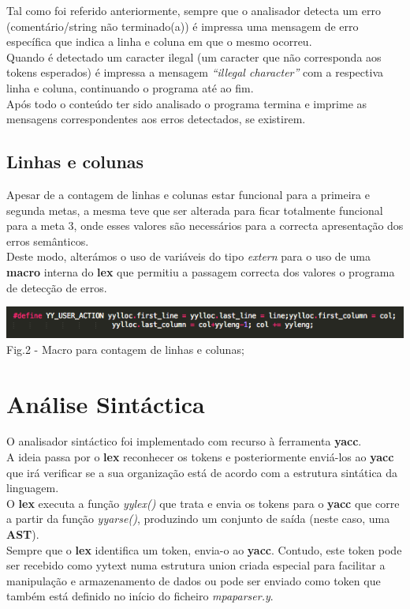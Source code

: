 \documentclass[12pt]{article}
\begin{document}
\indent Tal como foi referido anteriormente, sempre que o analisador detecta um erro (comentário/string não terminado(a)) é impressa uma mensagem de erro específica que indica a linha e coluna em que o mesmo ocorreu.\\
\indent Quando é detectado um caracter ilegal (um caracter que não corresponda aos tokens esperados) é impressa a mensagem \textit{``illegal character''} com a respectiva linha e coluna, continuando o programa até ao fim.\\
\indent Após todo o conteúdo ter sido analisado o programa termina e imprime as mensagens correspondentes aos erros detectados, se existirem.

\newpage

\subsection{Linhas e colunas}

\indent Apesar de a contagem de linhas e colunas estar funcional para a primeira e segunda metas, a mesma teve que ser alterada para ficar totalmente funcional para a meta 3, onde esses valores são necessários para a correcta apresentação dos erros semânticos.\\
\indent Deste modo, alterámos o uso de variáveis do tipo \textit{extern} para o uso de uma \textbf{macro} interna do \textbf{lex} que permitiu a passagem correcta dos valores o programa de detecção de erros.

\begin{center}
\includegraphics[scale=0.9]{column_line_macro.png}\\
Fig.2 - Macro para contagem de linhas e colunas;
\end{center}


\newpage

\section{Análise Sintáctica}

\indent O analisador sintáctico foi implementado com recurso à ferramenta \textbf{yacc}.\\
\indent A ideia passa por o \textbf{lex} reconhecer os tokens e posteriormente enviá-los ao \textbf{yacc} que irá verificar se a sua organização está de acordo com a estrutura sintática da linguagem.\\
\indent O \textbf{lex} executa a função \textit{yylex()} que trata e envia os tokens para o \textbf{yacc} que corre a partir da função \textit{yyarse()}, produzindo um conjunto de saída (neste caso, uma \textbf{AST}).\\ 
\indent Sempre que o \textbf{lex} identifica um token, envia-o ao \textbf{yacc}. Contudo, este token pode ser recebido como yytext numa estrutura union criada especial para facilitar a manipulação e armazenamento de dados ou pode ser enviado como token que também está definido no início do ficheiro \textit{mpaparser.y}.
\end{document}
